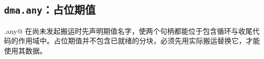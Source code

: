 \subsection*{\texttt{dma.any}：占位期值}

\co@dma.any@ 在尚未发起搬运时先声明期值名字，使两个句柄都能位于包含循环与收尾代码的作用域中。占位期值并不包含已就绪的分块，必须先用实际搬运替换它，才能使用其数据。
